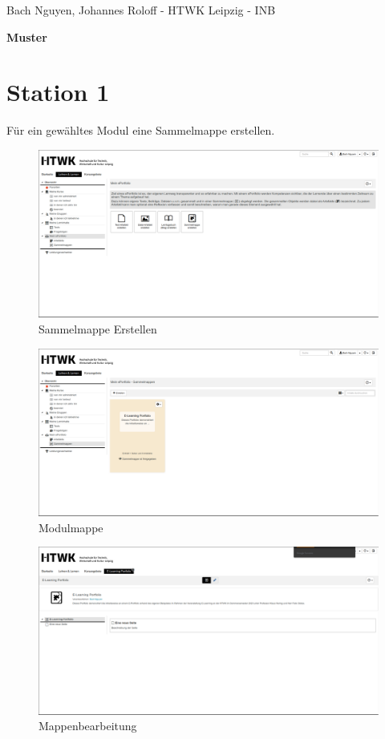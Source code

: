 \documentclass[a4paper,oneside]{scrarticle}
\begin{document}
	\begin{flushleft}
		Bach Nguyen, Johannes Roloff - HTWK Leipzig - INB
	\end{flushleft}
	\begin{center}
		\begin{LARGE}
			\textbf{Muster}
		\end{LARGE}
	\end{center}
	\section*{Station 1}
	Für ein gewähltes Modul eine Sammelmappe erstellen.
	\begin{figure}[h]
		\centering
		\includegraphics[width=0.8\linewidth]{001_sammelmappeErstellen}
		\caption{Sammelmappe Erstellen}
		\label{fig:001sammelmappeerstellen}
	\end{figure}
	\begin{figure}[h]
		\centering
		\includegraphics[width=0.8\linewidth]{002_ModulMappe}
		\caption{Modulmappe}
		\label{fig:002modulmappe}
	\end{figure}
	\begin{figure}[h]
		\centering
		\includegraphics[width=0.8\linewidth]{003_BearbeitungMappe}
		\caption{Mappenbearbeitung}
		\label{fig:003bearbeitungmappe}
	\end{figure}
\end{document}
